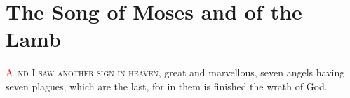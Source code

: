 
\chapter{The Song of Moses and of the Lamb}
\fancyhead{} %
\lettrine[lines=3,slope=0.5em,lraise=0.3]{\textcolor{red}{A}}{\ nd I saw another sign in heaven}, great and marvellous, seven angels having seven plagues,%
 which are the last, for in them is finished the wrath of God.
\newline

